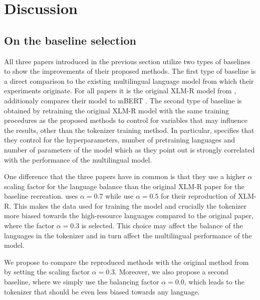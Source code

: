 
\chapter{Discussion}



\section{On the baseline selection}

All three papers introduced in the previous section utilize two types of baselines to show the improvements of their proposed methods. The first type of baseline is a direct comparison to the existing multilingual language model from which their experiments originate. For all papers it is the original XLM-R model from \citet{conneau_unsupervised_2020}, \citet{chung_improving_2020} additionaly compares their model to mBERT \cite{devlin_bert_2019}. The second type of baseline is obtained by retraining the original XLM-R model with the same training procedures as the proposed methods to control for variables that may influence the results, other than the tokenizer training method. In particular, \citet{chung_improving_2020} specifies that they control for the hyperparameters, number of pretraining languages and number of parameters of the model which as they point out is strongly correlated with the performance of the multilingual model. \cite{conneau_unsupervised_2020}

One difference that the three papers have in common is that they use a higher $\alpha$ scaling factor for the language balance than the original XLM-R paper for the baseline recreation. \citet{zheng_allocating_2021} uses $\alpha=0.7$ while \citet{chung_improving_2020,liang_xlm-v_2023} use $\alpha=0.5$ for their reproduction of XLM-R. This makes the data used for training the model and crucially the tokenizer more biased towards the high-resource languages compared to the original paper, where the factor $\alpha=0.3$ is selected. This choice may affect the balance of the languages in the tokenizer and in turn affect the multilingual performance of the model.

We propose to compare the reproduced methods with the original method from \citet{conneau_unsupervised_2020} by setting the scaling factor $\alpha=0.3$. Moreover, we also propose a second baseline, where we simply use the balancing factor $\alpha=0.0$, which leads to the tokenizer that should be even less biased towards any language. 


